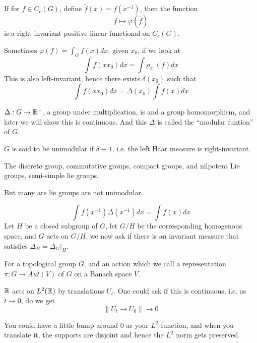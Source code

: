If for $f\in C_c(G)$, define $\tilde{f}(x)=f(x^{-1})$, then the function
\begin{equation*}
    f\mapsto \varphi(\tilde{f})
\end{equation*}
is a right invariant positive linear functional on $C_c(G)$.

Sometimes $\varphi(f)=\int_Gf(x)dx$, given $x_0$, if we look at 
\begin{equation*}
    \int f(xx_0)dx=\int \rho_{x_0}(f)dx
\end{equation*}
This is also left-invariant, hence there exists $\delta(x_0)$ such that 
\begin{equation*}
    \int f(xx_0)dx=\Delta(x_0)\int f(x)dx
\end{equation*}
\begin{proposition}
    $\Delta: G\to\mathbb{R}^+$, a group under multiplication, is and a group homomorphism, and later we will show this is continuous. And this $\Delta$ is called the ``modular funtion'' of $G$.
\end{proposition}

\begin{definition}
    $G$ is said to be unimodular if $\delta\equiv 1$, i.e. the left Haar measure is right-invariant.
\end{definition}
\begin{example}
    The discrete group, commutative groups, compact groups, and nilpotent Lie groups, semi-simple lie groups.
\end{example}
But many are lie groups are not unimodular.

\begin{equation*}
    \int f(x^{-1})\Delta(x^{-1})dx=\int f(x)dx
\end{equation*}
Let $H$ be a closed subgroup of $G$, let $G/H$ be the corresponding homogenous space, and $G$ acts on $G/H$, we now ask if there is an invariant measure that satisfies $\Delta_H=\Delta_G\vert_H$. 

\begin{definition}
    For a topological group $G$, and an action which we call a representation $\pi: G\to Aut(V)$ of $G$ on a Banach space $V$.
\end{definition}
\begin{example}
    $\mathbb{R}$ acts on $L^2(\mathbb{R})$ by translations $U_t$. One could ask if this is continuous, i.e. as $t\to 0$, do we get
    \begin{equation*}
        \|U_t\to U_0\|\to 0
    \end{equation*}
\end{example}
You could have a little bump around 0 as your $L^2$ function, and when you translate it, the supports are disjoint and hence the $L^2$ norm gets preserved.

